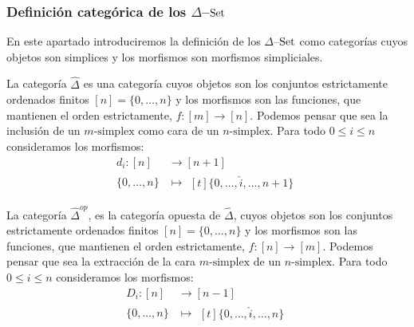 \documentclass[../main.tex]{subfiles}
\begin{document}
\subsubsection{Definici\'on categ\'orica de los $\Delta$--$\mathop{\rm Set}$}
En este apartado introduciremos la definici\'on de los $\Delta$--$\mathop{\rm Set}$ como categor\'ias cuyos objetos son simplices y los morfismos son morfismos simpliciales.
\begin{defi}
    La categor\'ia $\hat{\Delta}$ es una categor\'ia cuyos objetos son los conjuntos estrictamente ordenados finitos $[n] = \{0,\dots,n\}$ y los morfismos son las funciones, que mantienen el orden estrictamente, $f\colon [m] \to [n]$. Podemos pensar que sea la inclusi\'on de un $m\text{-simplex}$ como cara de un $n\text{-simplex}$.
    Para todo $0\le i \le n$ consideramos los morfismos:
    \begin{align*}
        d_i: [n]      & \longrightarrow [n+1] \\
        \{0,\dots,n\} & \longmapsto\!
        \begin{aligned}[t]
            \{0,\dots, \hat{i}, \dots,n+1\}
        \end{aligned}
    \end{align*}
\end{defi}

\begin{defi}
    La categor\'ia $\hat{\Delta}^{op}$, es la categor\'ia opuesta de $\hat{\Delta}$, cuyos objetos son los conjuntos estrictamente ordenados finitos $[n] = \{0,\dots,n\}$ y los morfismos son las funciones, que mantienen el orden estrictamente, $f: [n] \to [m]$. Podemos pensar que sea la extracci\'on de la cara $m\text{-simplex}$ de un $n\text{-simplex}$.
    Para todo $0\le i \le n$ consideramos los morfismos:
    \begin{align*}
        D_i: [n]      & \longrightarrow [n-1] \\
        \{0,\dots,n\} & \longmapsto\!
        \begin{aligned}[t]
            \{0,\dots, \hat{i}, \dots,n\}
        \end{aligned}
    \end{align*}
\end{defi}
\end{document}
